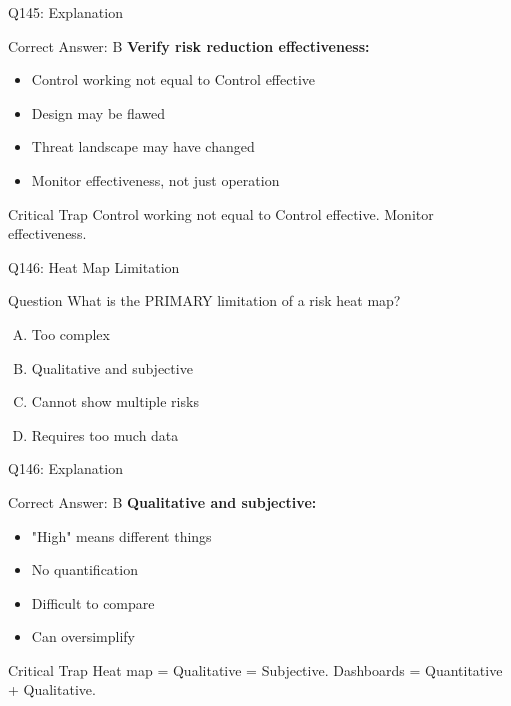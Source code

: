 \documentclass{beamer}
\begin{document}
	\begin{frame}{Q145: Explanation}
		\begin{block}{Correct Answer: B}
			\textbf{Verify risk reduction effectiveness:}
			\begin{itemize}
				\item Control working not equal to Control effective
				\item Design may be flawed
				\item Threat landscape may have changed
				\item Monitor effectiveness, not just operation
			\end{itemize}
		\end{block}
		\begin{alertblock}{Critical Trap}
			Control working not equal to Control effective.
			Monitor effectiveness.
		\end{alertblock}
	\end{frame}
	
	\begin{frame}{Q146: Heat Map Limitation}
		\begin{block}{Question}
			What is the PRIMARY limitation of a risk heat map?
		\end{block}
		\begin{enumerate}[(A)]
			\item Too complex
			\item Qualitative and subjective
			\item Cannot show multiple risks
			\item Requires too much data
		\end{enumerate}
	\end{frame}
	
	\begin{frame}{Q146: Explanation}
		\begin{block}{Correct Answer: B}
			\textbf{Qualitative and subjective:}
			\begin{itemize}
				\item "High" means different things
				\item No quantification
				\item Difficult to compare
				\item Can oversimplify
			\end{itemize}
		\end{block}
		\begin{alertblock}{Critical Trap}
			Heat map = Qualitative = Subjective.
			Dashboards = Quantitative + Qualitative.
		\end{alertblock}
	\end{frame}
	
\end{document}
